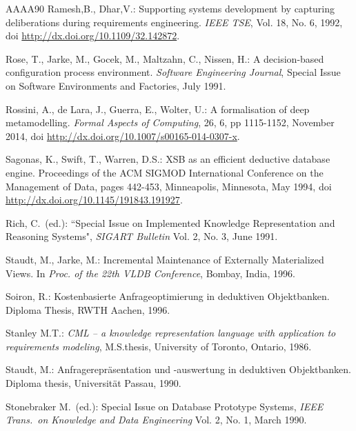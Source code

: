\begin{thebibliography}{AAAA90}
 Ramesh,B., Dhar,V.: Supporting systems development by capturing
deliberations during requirements engineering. {\it IEEE TSE\/}, Vol. 18, No. 6, 1992,
doi \url{http://dx.doi.org/10.1109/32.142872}.

 Rose, T., Jarke, M., Gocek, M., Maltzahn, C., Nissen, H.:
A decision-based configuration process environment. {\it Software
Engineering Journal\/}, Special Issue on Software Environments and
Factories, July 1991.

 Rossini, A., de Lara, J., Guerra, E., Wolter, U.:
A formalisation of deep metamodelling. {\it Formal Aspects of Computing}, 26, 6,
pp 1115-1152, November 2014,
doi \url{http://dx.doi.org/10.1007/s00165-014-0307-x}.

 Sagonas, K., Swift, T., Warren, D.S.:
XSB as an efficient deductive database engine.
Proceedings of the ACM SIGMOD International Conference on the Management of Data,
pages 442-453, Minneapolis, Minnesota, May 1994,
doi \url{http://dx.doi.org/10.1145/191843.191927}.

Rich, C.\ (ed.):
``Special Issue on Implemented Knowledge Representation and Reasoning Systems",
{\em SIGART Bulletin} Vol. 2, No. 3, June 1991.

 Staudt, M., Jarke, M.:
Incremental Maintenance of Externally Materialized Views. In {\em Proc. of the
22th VLDB Conference}, Bombay, India, 1996.

 Soiron, R.:
Kostenbasierte Anfrageoptimierung in deduktiven Objektbanken. Diploma Thesis, RWTH Aachen, 1996.

Stanley M.T.:
{\em CML -- a knowledge representation language with application to requirements modeling},
M.S.thesis, University of Toronto, Ontario, 1986.

 Staudt, M.: Anfragerepr{\"a}sentation und -auswertung
in deduktiven Objektbanken. Diploma thesis, Universit{\"a}t Passau, 1990.

Stonebraker M.\ (ed.):
Special Issue on Database Prototype Systems,
{\em IEEE Trans.\ on Knowledge and Data Engineering} Vol. 2, No. 1, March 1990.


\end{thebibliography}

